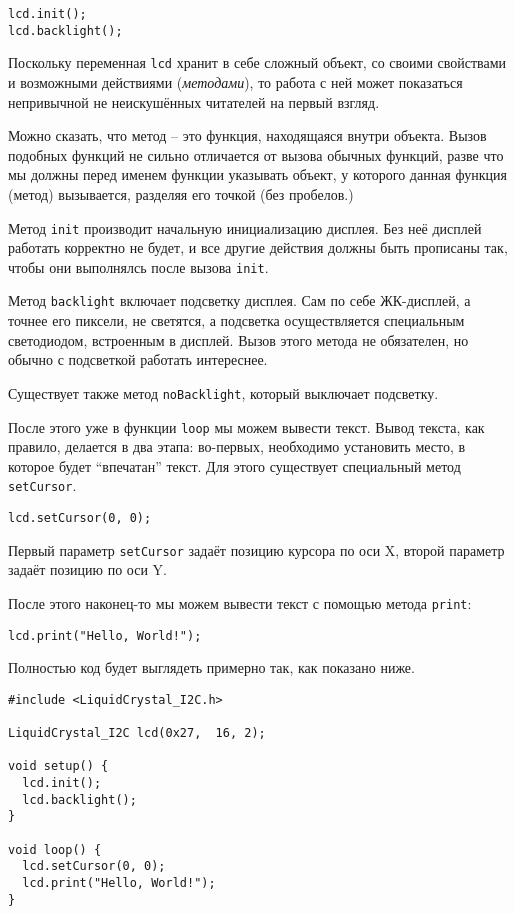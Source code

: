 \documentclass[../sparc.tex]{subfiles}
\begin{document}
\begin{verbatim}
lcd.init();
lcd.backlight();
\end{verbatim}

Поскольку переменная \texttt{lcd} хранит в себе сложный объект, со своими
свойствами и возможными действиями (\emph{методами}), то работа с ней может показаться
непривычной не неискушённых читателей на первый взгляд.

Можно сказать, что \gls{метод} -- это функция, находящаяся внутри объекта.
Вызов подобных функций не сильно отличается от вызова обычных функций, разве что
мы должны перед именем функции указывать объект, у которого данная функция
(метод) вызывается, разделяя его точкой (без пробелов.)

Метод \texttt{init} производит начальную инициализацию дисплея.  Без неё дисплей
работать корректно не будет, и все другие действия должны быть прописаны так,
чтобы они выполнялсь после вызова \texttt{init}.

Метод \texttt{backlight} включает подсветку дисплея.  Сам по себе ЖК-дисплей, а
точнее его пиксели, не светятся, а подсветка осуществляется специальным
светодиодом, встроенным в дисплей.  Вызов этого метода не обязателен, но обычно
с подсветкой работать интереснее.

Существует также метод \texttt{noBacklight}, который выключает подсветку.

После этого уже в функции \texttt{loop} мы можем вывести текст.  Вывод текста,
как правило, делается в два этапа: во-первых, необходимо установить место, в
которое будет ``впечатан'' текст.  Для этого существует специальный метод
\texttt{setCursor}.

\begin{verbatim}
lcd.setCursor(0, 0);
\end{verbatim}

Первый параметр \texttt{setCursor} задаёт позицию курсора по оси X, второй
параметр задаёт позицию по оси Y.

После этого наконец-то мы можем вывести текст с помощью метода \texttt{print}:

\begin{verbatim}
lcd.print("Hello, World!");
\end{verbatim}

Полностью код будет выглядеть примерно так, как показано ниже.

\begin{verbatim}
#include <LiquidCrystal_I2C.h>

LiquidCrystal_I2C lcd(0x27,  16, 2);

void setup() {
  lcd.init();
  lcd.backlight();
}

void loop() {
  lcd.setCursor(0, 0);
  lcd.print("Hello, World!");
}
\end{verbatim}
\end{document}
